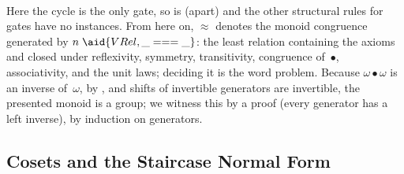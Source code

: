 \begin{code}
\AgdaSymbol{(}\AgdaSpace{}%
\AgdaSymbol{:}\AgdaSpace{}%
\AgdaSpace{}%
\AgdaSymbol{)}\AgdaSpace{}%
\<%
\\
\>[.][@{}l@{}]\<[361I]%
\>[10]\AgdaSymbol{(}\AgdaSpace{}%
\AgdaSymbol{)}\AgdaSpace{}%
\AgdaSpace{}%
\AgdaOperator{\AgdaInductiveConstructor{[}}\AgdaSpace{}%
\AgdaSpace{}%
\AgdaSpace{}%
\AgdaSpace{}%
\AgdaSpace{}%
\AgdaOperator{\AgdaInductiveConstructor{]ʷ}}\AgdaSpace{}%
\AgdaSpace{}%
\AgdaOperator{\AgdaInductiveConstructor{[}}\AgdaSpace{}%
\AgdaSpace{}%
\AgdaSpace{}%
\AgdaOperator{\AgdaInductiveConstructor{]ʷ}}\AgdaSpace{}%
\AgdaOperator{\AgdaDatatype{===}}\AgdaSpace{}%
\AgdaOperator{\AgdaInductiveConstructor{[}}\AgdaSpace{}%
\AgdaSpace{}%
\AgdaSpace{}%
\AgdaOperator{\AgdaInductiveConstructor{]ʷ}}\AgdaSpace{}%
\AgdaSpace{}%
\AgdaOperator{\AgdaInductiveConstructor{[}}\AgdaSpace{}%
\AgdaSpace{}%
\AgdaSpace{}%
\AgdaSpace{}%
\AgdaSpace{}%
\AgdaOperator{\AgdaInductiveConstructor{]ʷ}}\<%
\end{code}
Here the cycle is the only gate, so  is (apart) and the other structural rules for gates have no instances. From here on, $\approx$ denotes the monoid congruence generated by $n\;\aid{VRel,{\_}==={\_}}$: the least relation containing the axioms and closed under reflexivity, symmetry, transitivity, congruence of~$\bullet$, associativity, and the unit laws; deciding it is the word problem. Because $\omega \bullet \omega$ is an inverse of~$\omega$, by , and shifts of invertible generators are invertible, the presented monoid is a group; we witness this by a  proof (every generator has a left inverse), by induction on generators.

\subsection{Cosets and the Staircase Normal Form}\label{sec:case-nf}

